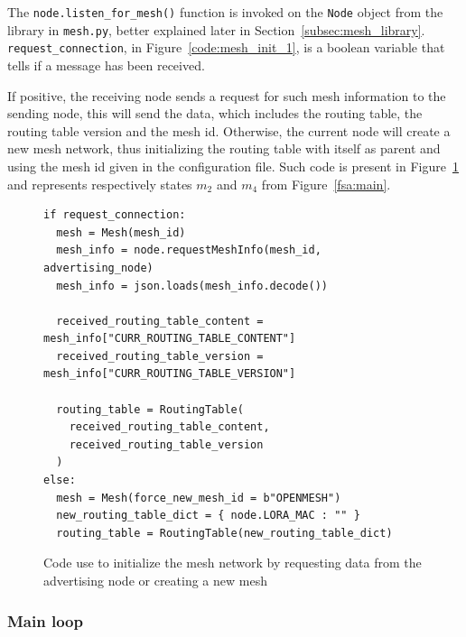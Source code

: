 				The \texttt{node.listen\_for\_mesh()} function is invoked on the \texttt{Node} object from the library in \texttt{mesh.py}, better explained later in Section~\ref{subsec:mesh_library}.				
				\texttt{request\_connection}, in Figure~\ref{code:mesh_init_1}, is a boolean variable that tells if a message has been received.
				
				If positive, the receiving node sends a request for such mesh information to the sending node, this will send the data, which includes the routing table, the routing table version and the mesh id.
				Otherwise, the current node will create a new mesh network, thus initializing the routing table with itself as parent and using the mesh id given in the configuration file.
				Such code is present in Figure~\ref{code:mesh_init_2} and represents respectively states $m_{2}$ and $m_{4}$ from Figure~\ref{fsa:main}.
									
				\begin{figure}	
					\begin{lstlisting}
if request_connection:
  mesh = Mesh(mesh_id)
  mesh_info = node.requestMeshInfo(mesh_id, advertising_node)
  mesh_info = json.loads(mesh_info.decode())

  received_routing_table_content = mesh_info["CURR_ROUTING_TABLE_CONTENT"]
  received_routing_table_version = mesh_info["CURR_ROUTING_TABLE_VERSION"]
  
  routing_table = RoutingTable(
    received_routing_table_content, 
    received_routing_table_version
  )
else:
  mesh = Mesh(force_new_mesh_id = b"OPENMESH")
  new_routing_table_dict = { node.LORA_MAC : "" }
  routing_table = RoutingTable(new_routing_table_dict)
					\end{lstlisting}
					\caption{Code use to initialize the mesh network by requesting data from the advertising node or creating a new mesh}
					\label{code:mesh_init_2}
				\end{figure}
			
	
			\subsubsection{Main loop}\label{subsec:loop}
	
